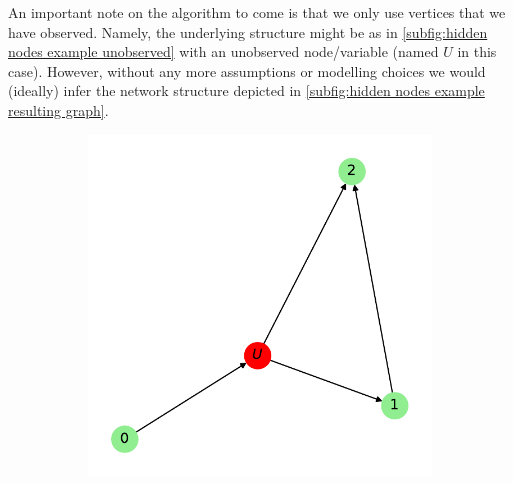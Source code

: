 \documentclass[../Thesis.tex]{subfiles}
\begin{document}
An important note on the algorithm to come is that we only use vertices that we have observed. Namely, the underlying structure might be as in \autoref{subfig:hidden nodes example unobserved} with an unobserved node/variable (named $U$ in this case). However, without any more assumptions or modelling choices we would (ideally) infer the network structure depicted in \autoref{subfig:hidden nodes example resulting graph}.
\begin{figure}[t]
    \centering
    \begin{subfigure}[t]{0.49\textwidth}
        \centering
        \includegraphics[width=\linewidth]{figures/ND examples/Hidden nodes/graph example w hidden.pdf}
        \caption{}
        \label{subfig:hidden nodes example unobserved}
    \end{subfigure}
    \begin{subfigure}[t]{0.49\textwidth}
        \centering

\end{subfigure}
\end{figure}
\end{document}
